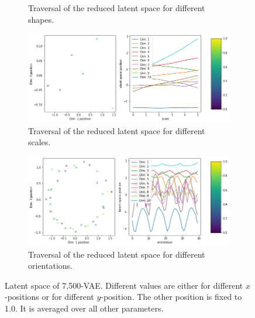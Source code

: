 \begin{figure}[H]
\begin{subfigure}{.48\textwidth}
        \caption{Traversal of the reduced latent space for different shapes.}
    \end{subfigure}
    \begin{subfigure}{.48\textwidth}
        \includegraphics[width=\textwidth]{images/latent_space_traversals/vae_7500_dsprites_latent_space_values_scale.png}
        \caption{Traversal of the reduced latent space for different scales.}
    \end{subfigure}
    \begin{subfigure}{.48\textwidth}
        \includegraphics[width=\textwidth]{images/latent_space_traversals/vae_7500_dsprites_latent_space_values_orientation.png}
        \caption{Traversal of the reduced latent space for different orientations.}
    \end{subfigure}
    \caption[7,500-VAE - Latent Space Values]{Latent space of 7,500-\ac{VAE}. Different values are either for different $x$-positions or for different $y$-position. The other position is fixed to 1.0. It is averaged over all other parameters.}
    \label{fig:vae_dsprite_7500_latent_space_position}
\end{figure}

